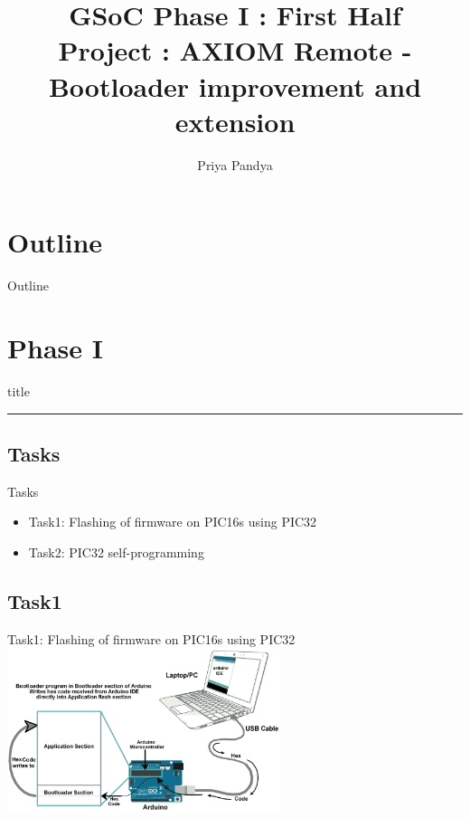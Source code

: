 \documentclass{beamer}
\title{\textbf{GSoC Phase I} : First Half \\ 
		\textbf{Project} : AXIOM Remote - Bootloader improvement and extension}
\author{Priya Pandya}
\date
\begin{document}
{
    \frame{\titlepage}
}

\section*{Outline}

\begin{frame}{Outline}
    \tableofcontents
\end{frame}

\section{Phase I}

\begin{frame}[plain]
    \begin{beamercolorbox}[sep=8pt,center,shadow=true,rounded=true]{title}
        \insertsectionhead\par
        \color{apertus_orange}\noindent\rule{10cm}{1pt}
    \end{beamercolorbox}
\end{frame}

\subsection{Tasks}

\begin{frame}{Tasks}
	\begin{itemize}
		\item Task1: Flashing of firmware on PIC16s using PIC32
		\item Task2: PIC32 self-programming
	\end{itemize}
\end{frame}

\subsection{Task1}

\begin{frame}{Task1: Flashing of firmware on PIC16s using PIC32}
	\includegraphics[width=8cm, center]{images/task1.png}
\end{frame}
\end{document}
